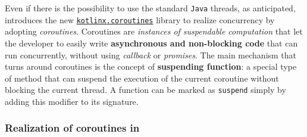 Even if there is the possibility to use the standard \texttt{Java} threads, as anticipated, \Kotlin introduces the new \href{https://github.com/Kotlin/kotlinx.coroutines}{\texttt{kotlinx.coroutines}} library to realize concurrency by adopting \textit{coroutines}. Coroutines are \textit{instances of suspendable computation} that let the developer to easily write \textbf{asynchronous and non-blocking code} that can run concurrently, without using \textit{callback} or \textit{promises}.
The main mechanism that turns around \Kotlin coroutines is the concept of \textbf{suspending function}: a special type of \Kotlin method that can suspend the execution of the current coroutine without blocking the current thread. A function can be marked as \texttt{suspend} simply by adding this modifier to its signature.

\subsubsection{Realization of coroutines in \Kotlin}

